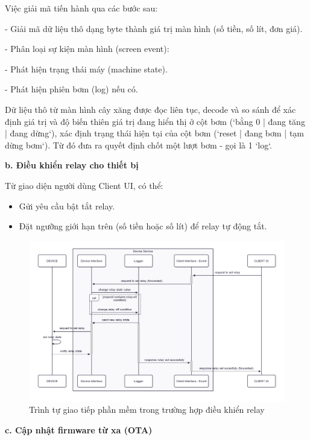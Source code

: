 Việc giải mã tiến hành qua các bước sau:

- Giải mã dữ liệu thô dạng byte thành giá trị màn hình (số tiền, số lít, đơn giá).

- Phân loại sự kiện màn hình (screen event): 

- Phát hiện trạng thái máy (machine state).

- Phát hiện phiên bơm (log) nếu có.

Dữ liệu thô từ màn hình cây xăng được đọc liên tục, decode và so sánh để xác định giá trị và độ biến thiên giá trị đang hiển thị ở cột bơm (`bằng 0 | đang tăng | đang dừng`), xác định trạng thái hiện tại của cột bơm (`reset | đang bơm | tạm dừng bơm`). Từ đó đưa ra quyết định chốt một lượt bơm - gọi là 1 `log`.






\textbf{
b. Điều khiển relay cho thiết bị 
}

Từ giao diện người dùng Client UI, có thể:

\begin{itemize}
    \item Gửi yêu cầu bật tắt relay. 
    \item Đặt ngưỡng giới hạn trên (số tiền hoặc số lít) để relay tự động tắt.
\end{itemize}


\begin{figure}[!ht]
     \centering
    \includegraphics[width=0.8\linewidth]{Figures/DeviceService_implemetation-sequece-relay-control.png}
    \caption{Trình tự giao tiếp phần mềm trong trường hợp điều khiển relay}
    \label{fig:DeviceService_implemetation-sequece-relay-control}
\end{figure}

\FloatBarrier

\textbf{
c. Cập nhật firmware từ xa (OTA) 
}

